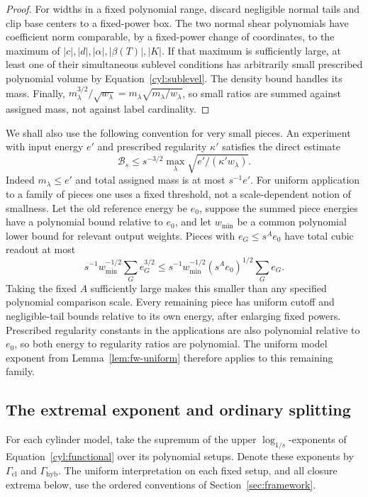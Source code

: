 \begin{proof}
For widths in a fixed polynomial range, discard negligible normal tails
and clip base centers to a fixed-power box.  The two normal shear
polynomials have coefficient norm comparable, by a fixed-power change
of coordinates, to the maximum of $|c|,|d|,|\alpha|,|\beta(T)|,|K|$.
If that maximum is sufficiently large, at least one of their simultaneous
sublevel conditions has arbitrarily small prescribed polynomial volume
by Equation~\eqref{cyl:sublevel}.  The density bound handles its mass.
Finally,
$m_\lambda^{3/2}/\sqrt{w_\lambda}
 =m_\lambda\sqrt{m_\lambda/w_\lambda}$, so small ratios are summed
against assigned mass, not against label cardinality.
\end{proof}

We shall also use the following convention for very small pieces.  An
experiment with input energy $e'$ and prescribed regularity $\kappa'$
satisfies the direct estimate
\begin{equation}\label{cyl:tiny-energy}
 \mathcal B_s\le s^{-3/2}
       \max_\lambda\sqrt{e'/(\kappa'w_\lambda)}.
\end{equation}
Indeed $m_\lambda\le e'$ and total assigned mass is at most $s^{-1}e'$.
For uniform application to a family of pieces one uses a fixed threshold,
not a scale-dependent notion of smallness.  Let the old reference energy
be $e_0$, suppose the summed piece energies have a polynomial bound
relative to $e_0$, and let $w_{\min}$ be a common polynomial lower bound
for relevant output weights.  Pieces with $e_G\le s^A e_0$ have total
cubic readout at most
\[
 s^{-1}w_{\min}^{-1/2}\sum_G e_G^{3/2}
 \le s^{-1}w_{\min}^{-1/2}(s^A e_0)^{1/2}\sum_Ge_G.
\]
Taking the fixed $A$ sufficiently large makes this smaller than any
specified polynomial comparison scale.  Every remaining piece has
uniform cutoff and negligible-tail bounds relative to its own energy,
after enlarging fixed powers.  Prescribed regularity constants in the
applications are also polynomial relative to $e_0$, so both energy to
regularity ratios are polynomial.  The uniform model exponent from
Lemma~\ref{lem:fw-uniform} therefore applies to this remaining family.

\subsection{The extremal exponent and ordinary splitting}
\label{cyl:extremal-exponent}

For each cylinder model, take the supremum of the upper
$\log_{1/s}$-exponents of Equation~\eqref{cyl:functional} over its
polynomial setups. Denote these exponents by $\Gamma_{\mathrm{cl}}$
and $\Gamma_{\mathrm{hyb}}$. The uniform interpretation on each fixed
setup, and all closure extrema below, use the ordered conventions of
Section~\ref{sec:framework}.

